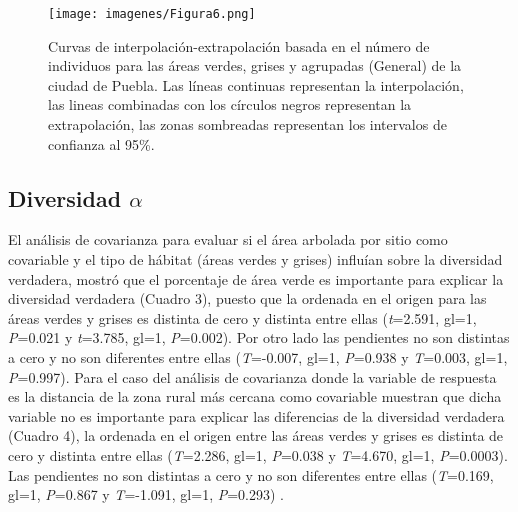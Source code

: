 \documentclass[letterpaper,12pt]{article}
\begin{document}
\begin{center}
\begin{figure}[H]
\texttt{[image: imagenes/Figura6.png]}
\caption[Curvas de interpolación/extrapolación.]{Curvas de interpolación-extrapolación basada en el número de  individuos para las áreas verdes, grises y agrupadas (General) de la ciudad de Puebla. Las líneas continuas representan la interpolación, las lineas combinadas con los círculos negros representan la extrapolación, las zonas sombreadas representan los intervalos de confianza al 95\%.}
\end{figure} 
\end{center}



\subsection{Diversidad $\alpha$}
El análisis de covarianza para evaluar si el área arbolada por sitio como covariable y el tipo de hábitat (áreas verdes y grises) influían sobre la diversidad verdadera, mostró que el porcentaje de área verde es importante para explicar la diversidad verdadera (Cuadro 3), puesto que la ordenada en el origen para las áreas verdes y grises es distinta de cero y distinta entre ellas (\textit{t}=2.591, gl=1, \textit{P}=0.021 y \textit{t}=3.785, gl=1, \textit{P}=0.002). Por otro lado las pendientes no son distintas a cero y no son diferentes entre ellas (\textit{T}=-0.007, gl=1, \textit{P}=0.938 y \textit{T}=0.003, gl=1, \textit{P}=0.997). Para el caso del análisis de covarianza  donde la variable de respuesta es la distancia de la zona rural más cercana como covariable muestran que dicha variable no es  importante para explicar las diferencias de la diversidad verdadera (Cuadro 4), la ordenada en el origen entre las áreas verdes y grises es distinta de cero y distinta entre ellas (\textit{T}=2.286, gl=1, \textit{P}=0.038 y \textit{T}=4.670, gl=1, \textit{P}=0.0003). Las pendientes no son distintas a cero y no son diferentes entre ellas (\textit{T}=0.169, gl=1, \textit{P}=0.867 y \textit{T}=-1.091, gl=1, \textit{P}=0.293) .
\end{document}

